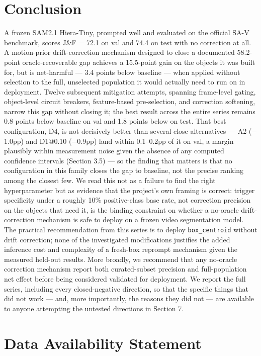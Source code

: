 \documentclass[11pt]{article}
\begin{document}
\section{Conclusion}

A frozen SAM2.1 Hiera-Tiny, prompted well and evaluated on the official SA-V benchmark, scores J\&F = 72.1 on val and 74.4 on test with no correction at all. A motion-prior drift-correction mechanism designed to close a documented 58.2-point oracle-recoverable gap achieves a 15.5-point gain on the objects it was built for, but is net-harmful — 3.4 points below baseline — when applied without selection to the full, unselected population it would actually need to run on in deployment. Twelve subsequent mitigation attempts, spanning frame-level gating, object-level circuit breakers, feature-based pre-selection, and correction softening, narrow this gap without closing it; the best result across the entire series remains 0.8 points below baseline on val and 1.8 points below on test. That best configuration, D4, is not decisively better than several close alternatives — A2 ($-$1.0pp) and D1@0.10 ($-$0.9pp) land within 0.1–0.2pp of it on val, a margin plausibly within measurement noise given the absence of any computed confidence intervals (Section 3.5) — so the finding that matters is that no configuration in this family closes the gap to baseline, not the precise ranking among the closest few. We read this not as a failure to find the right hyperparameter but as evidence that the project's own framing is correct: trigger specificity under a roughly 10\% positive-class base rate, not correction precision on the objects that need it, is the binding constraint on whether a no-oracle drift-correction mechanism is safe to deploy on a frozen video segmentation model. The practical recommendation from this series is to deploy \texttt{box\_centroid} without drift correction; none of the investigated modifications justifies the added inference cost and complexity of a fresh-box reprompt mechanism given the measured held-out results. More broadly, we recommend that any no-oracle correction mechanism report both curated-subset precision and full-population net effect before being considered validated for deployment. We report the full series, including every closed-negative direction, so that the specific things that did not work — and, more importantly, the reasons they did not — are available to anyone attempting the untested directions in Section 7.

\section*{Data Availability Statement}
\end{document}
